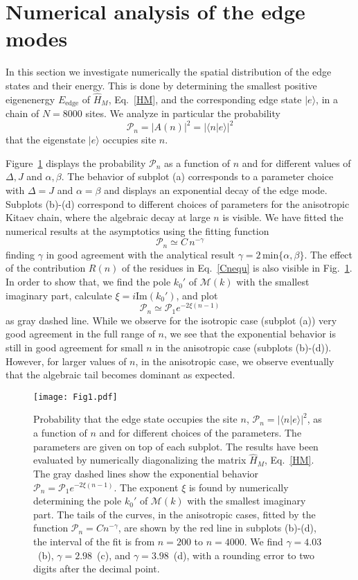 \documentclass[pra,twocolumn,
superscriptaddress,
showpacs,
aps
]{revtex4-1}
\begin{document}
\section{Numerical analysis of the edge modes}
\label{sec:3}

In this section we investigate numerically the spatial distribution of the edge states and their energy. This is done by determining the smallest positive eigenenergy $E_{\mathrm{edge}}$ of $\hat{H}_{M}$, Eq.~\eqref{HM}, and the corresponding edge state $|e\rangle$, in a chain of $N=8000$ sites. We analyze in particular the probability 
\[
\mathcal P_n=|A(n)|^2=|\langle n|e\rangle|^2
\]
that the eigenstate $|e\rangle$ occupies site $n$.

Figure~\ref{Fig:tails} displays the probability $\mathcal P_n$ as a function of $n$ and for different values of $\Delta,J$ and $\alpha,\beta$. The behavior of subplot (a) corresponds to a parameter choice with $\Delta=J$ and $\alpha=\beta$ and displays an exponential decay of the edge mode. Subplots (b)-(d) correspond to different choices of parameters for the anisotropic Kitaev chain, where the algebraic decay at large $n$ is visible. We have fitted the numerical results at the asymptotics using the fitting function 
\[
\mathcal P_n\simeq C \,n^{-\gamma}
\] 
finding $\gamma$ in good agreement with the analytical result
$\gamma=2\,\mathrm{min}\{\alpha,\beta\}$. 
The effect of the contribution $R(n)$ of the residues in Eq.~\eqref{Cnequ} is also visible in Fig.~\ref{Fig:tails}. In order to show that, we find the pole $k_0'$ of ${\mathcal M}(k)$ with the smallest imaginary part, calculate $\xi=i\textrm{Im}(k_0')$, and plot 
\[
\mathcal {P}_n\simeq \mathcal{P}_1 e^{-2 \xi (n-1)} 
\]
as gray dashed line. While we observe for the isotropic case (subplot (a)) very good agreement in the full range of $n$, we see that the exponential behavior is still in good agreement for small $n$ in the anisotropic case (subplots (b)-(d)). However, for larger values of $n$, in the anisotropic case, we observe eventually that the algebraic tail becomes dominant as expected.
\begin{figure}[ht]
	\center \texttt{[image: Fig1.pdf]}
	\caption{Probability that the edge state occupies the site $n$, $\mathcal P_n=|\langle n|e\rangle|^2$, as a function of $n$ and for different choices of the parameters. The parameters are given on top of each subplot. The results have been evaluated by numerically diagonalizing the matrix $\hat H_M$, Eq.~\eqref{HM}.  The gray dashed lines show the exponential behavior $\mathcal{P}_n=\mathcal{P}_1e^{-2\xi (n-1)}$. The exponent $\xi$ is  found by numerically determining  the pole $k_0'$ of ${\mathcal M}(k)$ with the smallest imaginary part. The tails of the curves, in the anisotropic cases, fitted by the function $\mathcal{P}_n=Cn^{-\gamma}$, are shown by the red line in subplots (b)-(d), the interval of the fit is from $n=200$ to $n=4000$. We find $\gamma=4.03$~(b), $\gamma=2.98$~(c), and $\gamma=3.98$~(d), with a rounding error to two digits after the decimal point.\label{Fig:tails}}
\end{figure}
\end{document}
